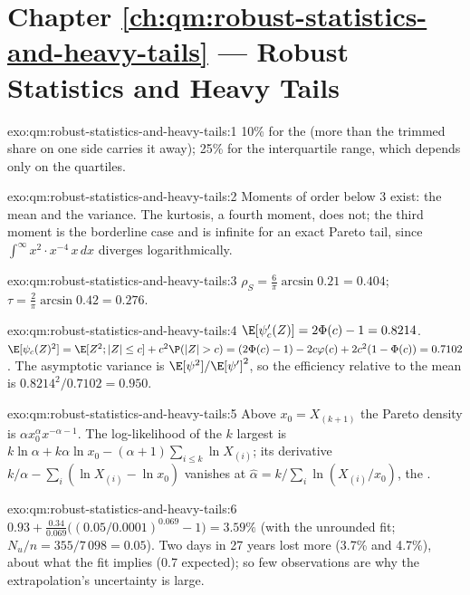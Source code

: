 \section*{Chapter \ref{ch:qm:robust-statistics-and-heavy-tails} --- Robust Statistics and Heavy Tails}

\begin{solution}{exo:qm:robust-statistics-and-heavy-tails:1}
10\% for the  (more than the trimmed share on one side carries it away); 25\% for the interquartile range, which depends only
on the quartiles.
\end{solution}

\begin{solution}{exo:qm:robust-statistics-and-heavy-tails:2}
Moments of order below 3 exist: the mean and the variance. The kurtosis, a fourth moment, does not; the third moment is the borderline case
and is infinite for an exact Pareto tail, since $\int^\infty x^2 \cdot x^{-4}\,x\,dx$ diverges logarithmically.
\end{solution}

\begin{solution}{exo:qm:robust-statistics-and-heavy-tails:3}
$\rho_S = \frac6\pi\arcsin0.21 = 0.404$; $\tau = \frac2\pi\arcsin0.42 = 0.276$.
\end{solution}

\begin{solution}{exo:qm:robust-statistics-and-heavy-tails:4}
$\E[\psi_c'(Z)] = 2\Phi(c) - 1 = 0.8214$. $\E[\psi_c(Z)^2] = \E[Z^2; |Z| \le c] + c^2\P(|Z| > c) = (2\Phi(c) - 1) - 2c\varphi(c) + 2c^2(1 - \Phi(c)) =
0.7102$. The asymptotic variance is $\E[\psi^2]/\E[\psi']^2$, so the efficiency relative to the mean is $0.8214^2/0.7102 = 0.950$.
\end{solution}

\begin{solution}{exo:qm:robust-statistics-and-heavy-tails:5}
Above $x_0 = X_{(k+1)}$ the Pareto density is $\alpha x_0^\alpha x^{-\alpha-1}$. The log-likelihood of the $k$ largest is $k\ln\alpha + k\alpha\ln x_0 - (\alpha +
1)\sum_{i \le k}\ln X_{(i)}$; its derivative $k/\alpha - \sum_i(\ln X_{(i)} - \ln x_0)$ vanishes at $\hat\alpha = k/\sum_i\ln(X_{(i)}/x_0)$, the .
\end{solution}

\begin{solution}{exo:qm:robust-statistics-and-heavy-tails:6}
$0.93 + \frac{0.34}{0.069}\bigl((0.05/0.0001)^{0.069} - 1\bigr) = 3.59\%$ (with the unrounded fit; $N_u/n = 355/7\,098 = 0.05$). Two days in 27 years
lost more (3.7\% and 4.7\%), about what the fit implies (0.7 expected); so few observations are why the extrapolation's
uncertainty is large.
\end{solution}

